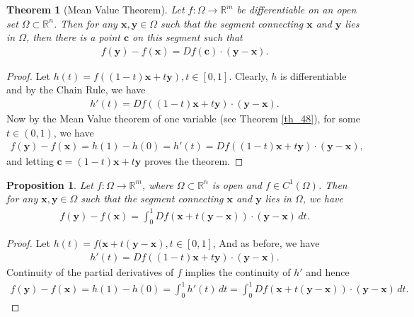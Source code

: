 \documentclass[10pt]{book}
\newtheorem{theorem}{Theorem}[chapter]
\newtheorem{proposition}{Proposition}[chapter]
\theoremstyle{definition}
\numberwithin{equation}{chapter}
\begin{document}
\begin{theorem}[Mean Value Theorem]\label{th_79}
Let $f: \Omega \to \mathbb{R}^m$ be differentiable on an open set $\Omega \subset \mathbb{R}^n$. Then for any $\mathbf{x}, \mathbf{y} \in \Omega$ such that the segment connecting $\mathbf{x}$ and $\mathbf{y}$ lies in $\Omega$, then there is a point $\mathbf{c}$ on this segment such that
\begin{align*}
    f(\mathbf{y}) - f(\mathbf{x}) = Df(\mathbf{c}) \cdot (\mathbf{y} - \mathbf{x}).
\end{align*}
\end{theorem}
\begin{proof}
Let $h(t) = f((1 - t)\mathbf{x} + t\mathbf{y}), t \in [0,1]$. Clearly, $h$ is differentiable and by the Chain Rule, we have
\begin{align*}
    h'(t) = Df((1 - t)\mathbf{x} + t\mathbf{y}) \cdot (\mathbf{y} - \mathbf{x}).
\end{align*}
Now by the Mean Value theorem of one variable (see Theorem \ref{th_48}), for some $t \in (0,1)$, we have
\begin{align*}
    f(\mathbf{y}) - f(\mathbf{x}) = h(1) - h(0) = h'(t) = Df((1 - t)\mathbf{x} + t\mathbf{y}) \cdot (\mathbf{y} - \mathbf{x}),
\end{align*}
and letting $\mathbf{c} = (1 - t)\mathbf{x} + t\mathbf{y}$ proves the theorem.
\end{proof}

\medskip

\begin{proposition}
Let $f: \Omega \to \mathbb{R}^m$, where $\Omega \subset \mathbb{R}^n$ is open and $f \in C^1(\Omega)$. Then for any $\mathbf{x}, \mathbf{y} \in \Omega$ such that the segment connecting $\mathbf{x}$ and $\mathbf{y}$ lies in $\Omega$, we have
\begin{align*}
    f(\mathbf{y}) - f(\mathbf{x}) = \int^1_0 Df(\mathbf{x} + t(\mathbf{y} - \mathbf{x})) \cdot (\mathbf{y} - \mathbf{x}) \,dt.
\end{align*}
\end{proposition}
\begin{proof}
Let $h(t) = f(\mathbf{x} + t(\mathbf{y} - \mathbf{x}), t \in [0,1]$, And as before, we have
\begin{align*}
    h'(t) = Df((1 - t)\mathbf{x} + t\mathbf{y}) \cdot (\mathbf{y} - \mathbf{x}).
\end{align*}
Continuity of the partial derivatives of $f$ implies the continuity of $h'$ and hence
\begin{align*}
    f(\mathbf{y}) - f(\mathbf{x}) = h(1) - h(0) = \int^1_0 h'(t) \,dt = \int^1_0 Df(\mathbf{x} + t(\mathbf{y} - \mathbf{x})) \cdot (\mathbf{y} - \mathbf{x}) \,dt.
\end{align*}
\end{proof}
\end{document}
